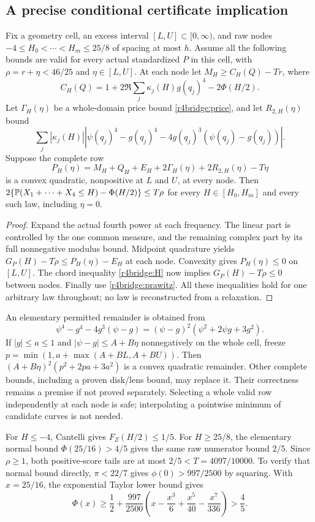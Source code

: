 \subsection{A precise conditional certificate implication}
\begin{theorem}
Fix a geometry cell, an excess interval $[L,U]\subset[0,\infty)$,
and raw nodes $-4\le H_0<\cdots<H_m\le25/8$ of spacing at most $h$.
Assume all the following bounds are valid for every actual standardized
$P$ in this cell, with $\rho=r+\eta<46/25$ and $\eta\in[L,U]$.
At each node let $M_H\ge C_H(Q)-Tr$, where
\[
 C_H(Q)=1+2\Re\sum_j\kappa_j(H)g(q_j)^4-2\Phi(H/2).
\]
Let $\Gamma_H(\eta)$ be a whole-domain price bound
\eqref{r4bridge:price}, and let $R_{2,H}(\eta)$ bound
\[
 \sum_j|\kappa_j(H)|
 |\psi(q_j)^4-g(q_j)^4-4g(q_j)^3(\psi(q_j)-g(q_j))|.
\]
Suppose the complete row
\[
 P_H(\eta)=M_H+Q_H+E_H+2\Gamma_H(\eta)+2R_{2,H}(\eta)-T\eta
\]
is a convex quadratic, nonpositive at $L$ and $U$, at every node.
Then $2\{\mathbb P(X_1+\cdots+X_4\le H)-\Phi(H/2)\}\le T\rho$
for every $H\in[H_0,H_m]$ and every such law, including $\eta=0$.
\end{theorem}
\begin{proof}
Expand the actual fourth power at each frequency. The linear part is
controlled by the one common measure, and the remaining complex part
by its full nonnegative modulus bound. Midpoint quadrature yields
$G_P(H)-T\rho\le P_H(\eta)-E_H$ at each node.
Convexity gives $P_H(\eta)\le0$ on $[L,U]$. The chord inequality
\eqref{r4bridge:H} now implies $G_P(H)-T\rho\le0$ between nodes.
Finally use \eqref{r4bridge:prawitz}. All these inequalities hold for
one arbitrary law throughout; no law is reconstructed from a relaxation.
\end{proof}

An elementary permitted remainder is obtained from
\[
 \psi^4-g^4-4g^3(\psi-g)
  =(\psi-g)^2(\psi^2+2\psi g+3g^2).
\]
If $|g|\le a\le1$ and $|\psi-g|\le A+B\eta$ nonnegatively on
the whole cell, freeze $p=\min(1,a+\max(A+BL,A+BU))$.
Then $(A+B\eta)^2(p^2+2pa+3a^2)$ is a convex quadratic remainder.
Other complete bounds, including a proven disk/lens bound, may replace
it. Their correctness remains a premise if not proved separately.
Selecting a whole valid row independently at each node is safe;
interpolating a pointwise minimum of candidate curves is not needed.

For $H\le-4$, Cantelli gives $F_Z(H/2)\le1/5$.
For $H\ge25/8$, the elementary normal bound $\Phi(25/16)>4/5$
gives the same raw numerator bound $2/5$. Since $\rho\ge1$, both
positive-score tails are at most $2/5<T=4097/10000$.
To verify that normal bound directly, $\pi<22/7$ gives
$\phi(0)>997/2500$ by squaring. With $x=25/16$, the exponential
Taylor lower bound gives
\[
 \Phi(x)\ge\frac12+\frac{997}{2500}
       \left(x-\frac{x^3}{6}+\frac{x^5}{40}-\frac{x^7}{336}\right)
       >\frac45.
\]

